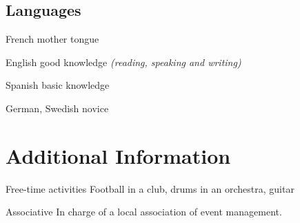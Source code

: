 \documentclass[10pt,a4paper]{moderncv}
\begin{document}
\subsection{Languages}

\cvlanguage
	{French}
	{mother tongue}
	{}

\cvlanguage
	{English}
	{good knowledge \textnormal{\textit{(reading, speaking and writing)}}}
	{}

\cvlanguage
	{Spanish}
	{basic knowledge}
	{}

\cvlanguage
	{German, Swedish}
	{novice}
	{}


\section{Additional Information}

\cvline
	{Free-time activities}
	{Football in a club, drums in an orchestra, guitar}

\cvline
	{Associative}
	{In charge of a local association of event management.}

\end{document}
